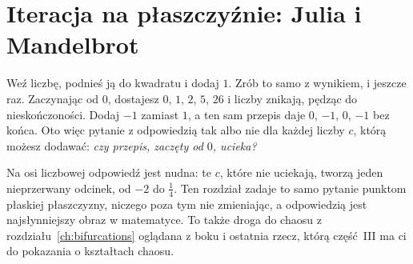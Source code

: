 
\chapter{Iteracja na płaszczyźnie: Julia i Mandelbrot}
\label{ch:mandelbrot}

\noindent
Weź liczbę, podnieś ją do kwadratu i dodaj $1$. Zrób to samo z wynikiem, i
jeszcze raz. Zaczynając od $0$, dostajesz $0$, $1$, $2$, $5$, $26$ i liczby
znikają, pędząc do nieskończoności. Dodaj $-1$ zamiast $1$, a ten sam
przepis daje $0$, $-1$, $0$, $-1$ bez końca. Oto więc pytanie z odpowiedzią
tak albo nie dla każdej liczby $c$, którą możesz dodawać: \emph{czy
przepis, zaczęty od $0$, ucieka?}

Na osi liczbowej odpowiedź jest nudna: te $c$, które nie uciekają, tworzą
jeden nieprzerwany odcinek, od $-2$ do $\tfrac14$. Ten rozdział zadaje to
samo pytanie punktom płaskiej płaszczyzny, niczego poza tym nie zmieniając,
a odpowiedzią jest najsłynniejszy obraz w matematyce. To także droga do
chaosu z rozdziału~\ref{ch:bifurcations} oglądana z boku i ostatnia rzecz,
którą część~III ma ci do pokazania o kształtach chaosu.

\begin{outcomes}
\end{outcomes}

